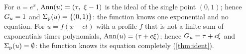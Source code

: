 \begin{example}\label{ex:extremes}
For $u=e^{x}$, $\operatorname{Ann}(u)=(\tau,\ \xi-1)$ is the ideal of the single point $(0,1)$; hence $G_u=1$ and
$\Sigma_{\mathrm p}(u)=\{(0,1)\}$: the function knows one exponential and no equation. For $u=f(x-ct)$ with a
profile $f$ that is not a finite sum of exponentials times polynomials,
$\operatorname{Ann}(u)=(\tau+c\xi)$; hence $G_u=\tau+c\xi$ and $\Sigma_{\mathrm p}(u)=\emptyset$: the function knows its
equation completely (\cref{thm:ident}).
\end{example}
